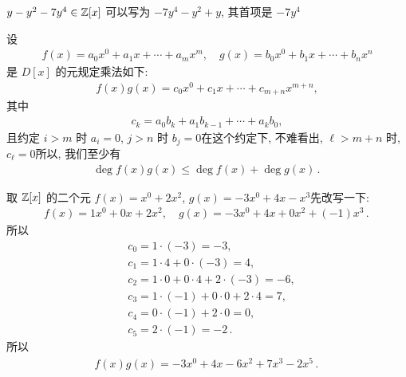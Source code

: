 \begin{example}
    $y - y^2 - 7y^4 \in \mathbb{Z}[x]$ 可以写为 $-7y^4 - y^2 + y$, 其首项是 $-7y^4$\period
\end{example}

\begin{definition}
    设
    \begin{align*}
        f(x) = a_0 x^0 + a_1 x + \cdots + a_m x^m, \quad g(x) = b_0 x^0 + b_1 x + \cdots + b_n x^n
    \end{align*}
    是 $D[x]$ 的元\period 规定乘法如下:
    \begin{align*}
        f(x) g(x) = c_0 x^0 + c_1 x + \cdots + c_{m+n} x^{m+n},
    \end{align*}
    其中
    \begin{align*}
        c_k = a_0 b_k + a_1 b_{k-1} + \cdots + a_k b_0,
    \end{align*}
    且约定 $i > m$ 时 $a_i = 0$, $j > n$ 时 $b_j = 0$\period 在这个约定下, 不难看出, $\ell > m+n$ 时, $c_\ell = 0$\period 所以, 我们至少有
    \begin{align*}
        \deg f(x)g(x) \leq \deg f(x) + \deg g(x) \period
    \end{align*}
\end{definition}

\begin{example}
    取 $\mathbb{Z}[x]$ 的二个元 $f(x)=x^0 + 2x^2$, $g(x)=-3x^0 + 4x - x^3$\period 先改写一下:
    \begin{align*}
        f(x) = 1x^0 + 0x + 2x^2, \quad g(x) = -3x^0 + 4x + 0x^2 + (-1)x^3 \period
    \end{align*}
    所以
    \begin{align*}
         & c_0 = 1 \cdot (-3) = -3,                         \\
         & c_1 = 1 \cdot 4 + 0 \cdot (-3) = 4,              \\
         & c_2 = 1 \cdot 0 + 0 \cdot 4 + 2 \cdot (-3) = -6, \\
         & c_3 = 1 \cdot (-1) + 0 \cdot 0 + 2 \cdot 4 = 7,  \\
         & c_4 = 0 \cdot (-1) + 2 \cdot 0 = 0,              \\
         & c_5 = 2 \cdot (-1) = -2 \period
    \end{align*}
    所以
    \begin{align*}
        f(x) g(x) = -3x^0 + 4x - 6x^2 + 7x^3 - 2x^5 \period
    \end{align*}
\end{example}

